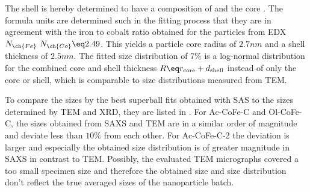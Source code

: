\documentclass[\main/dresen_thesis.tex]{subfiles}
\begin{document}
    The shell is hereby determined to have a composition of  and the core .
    The formula units are determined such in the fitting process that they are in agreement with the iron to cobalt ratio obtained for the particles from EDX $N_{\ch{Fe}} \ N_{\ch{Co}} \eq 2.49$.
    This yields a particle core radius of $2.7 \unit{nm}$ and a shell thickness of $2.5 \unit{nm}$.
    The fitted size distribution of $7 \%$ is a log-normal distribution for the combined core and shell thickness $R \eq r_\mathrm{core} + d_\mathrm{shell}$ instead of only the core or shell, which is comparable to size distributions measured from TEM.

    To compare the sizes by the best superball fits obtained with SAS to the sizes determined by TEM and XRD, they are listed in .
    For Ac-CoFe-C and Ol-CoFe-C, the sizes obtained from SAXS and TEM are in a similar order of magnitude and deviate less than $10 \%$ from each other.
    For Ac-CoFe-C-2 the deviation is larger and especially the obtained size distribution is of greater magnitude in SAXS in contrast to TEM.
    Possibly, the evaluated TEM micrographs covered a too small specimen size and therefore the obtained size and size distribution don't reflect the true averaged sizes of the nanoparticle batch.
\end{document}
